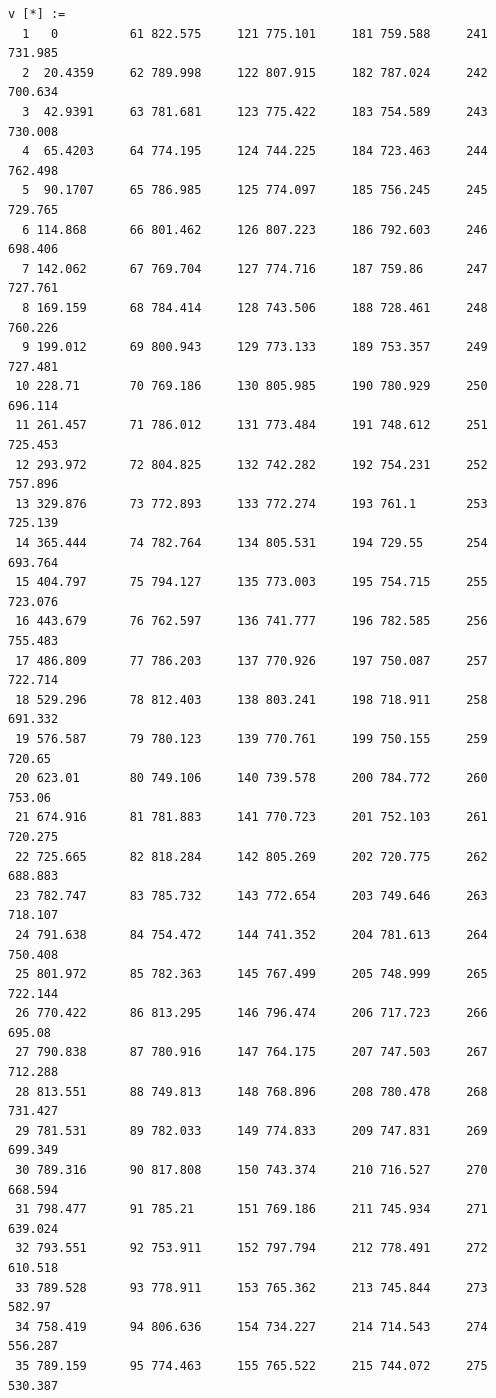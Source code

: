 \documentclass{article}
\begin{document}
\begin{verbatim}
v [*] :=
  1   0          61 822.575     121 775.101     181 759.588     241 731.985
  2  20.4359     62 789.998     122 807.915     182 787.024     242 700.634
  3  42.9391     63 781.681     123 775.422     183 754.589     243 730.008
  4  65.4203     64 774.195     124 744.225     184 723.463     244 762.498
  5  90.1707     65 786.985     125 774.097     185 756.245     245 729.765
  6 114.868      66 801.462     126 807.223     186 792.603     246 698.406
  7 142.062      67 769.704     127 774.716     187 759.86      247 727.761
  8 169.159      68 784.414     128 743.506     188 728.461     248 760.226
  9 199.012      69 800.943     129 773.133     189 753.357     249 727.481
 10 228.71       70 769.186     130 805.985     190 780.929     250 696.114
 11 261.457      71 786.012     131 773.484     191 748.612     251 725.453
 12 293.972      72 804.825     132 742.282     192 754.231     252 757.896
 13 329.876      73 772.893     133 772.274     193 761.1       253 725.139
 14 365.444      74 782.764     134 805.531     194 729.55      254 693.764
 15 404.797      75 794.127     135 773.003     195 754.715     255 723.076
 16 443.679      76 762.597     136 741.777     196 782.585     256 755.483
 17 486.809      77 786.203     137 770.926     197 750.087     257 722.714
 18 529.296      78 812.403     138 803.241     198 718.911     258 691.332
 19 576.587      79 780.123     139 770.761     199 750.155     259 720.65
 20 623.01       80 749.106     140 739.578     200 784.772     260 753.06
 21 674.916      81 781.883     141 770.723     201 752.103     261 720.275
 22 725.665      82 818.284     142 805.269     202 720.775     262 688.883
 23 782.747      83 785.732     143 772.654     203 749.646     263 718.107
 24 791.638      84 754.472     144 741.352     204 781.613     264 750.408
 25 801.972      85 782.363     145 767.499     205 748.999     265 722.144
 26 770.422      86 813.295     146 796.474     206 717.723     266 695.08
 27 790.838      87 780.916     147 764.175     207 747.503     267 712.288
 28 813.551      88 749.813     148 768.896     208 780.478     268 731.427
 29 781.531      89 782.033     149 774.833     209 747.831     269 699.349
 30 789.316      90 817.808     150 743.374     210 716.527     270 668.594
 31 798.477      91 785.21      151 769.186     211 745.934     271 639.024
 32 793.551      92 753.911     152 797.794     212 778.491     272 610.518
 33 789.528      93 778.911     153 765.362     213 745.844     273 582.97
 34 758.419      94 806.636     154 734.227     214 714.543     274 556.287
 35 789.159      95 774.463     155 765.522     215 744.072     275 530.387

\end{verbatim}
\end{document}

